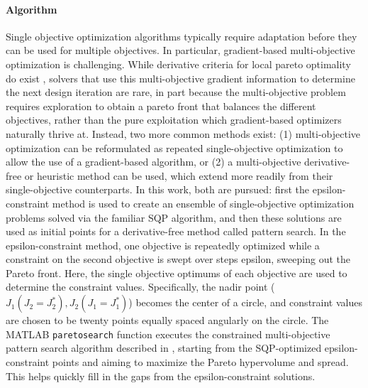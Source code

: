 \paragraph{Algorithm}
Single objective optimization algorithms typically require adaptation before they can be used for multiple objectives. In particular, gradient-based multi-objective optimization is challenging. While derivative criteria for local pareto optimality do exist \cite{desideri_multiple-gradient_2012}, solvers that use this multi-objective gradient information to determine the next design iteration are rare, in part because the multi-objective problem requires exploration to obtain a pareto front that balances the different objectives, rather than the pure exploitation which gradient-based optimizers naturally thrive at. Instead, two more common methods exist: (1) multi-objective optimization can be reformulated as repeated single-objective optimization to allow the use of a gradient-based algorithm, or (2) a multi-objective derivative-free or heuristic method can be used, which extend more readily from their single-objective counterparts. In this work, both are pursued: first the epsilon-constraint method is used to create an ensemble of single-objective optimization problems solved via the familiar SQP algorithm, and then these solutions are used as initial points for a derivative-free method called pattern search. In the epsilon-constraint method, one objective is repeatedly optimized while a constraint on the second objective is swept over steps epsilon, sweeping out the Pareto front. Here, the single objective optimums of each objective are used to determine the constraint values. Specifically, the nadir point ($J_1(J_2=J_2^*), J_2(J_1=J_1^*)$) becomes the center of a circle, and constraint values are chosen to be twenty points equally spaced angularly on the circle. The MATLAB  \texttt{paretosearch} function executes the constrained multi-objective pattern search algorithm described in \cite{custodio_direct_2011}, starting from the SQP-optimized epsilon-constraint points and aiming to maximize the Pareto hypervolume and spread. This helps quickly fill in the gaps from the epsilon-constraint solutions.



